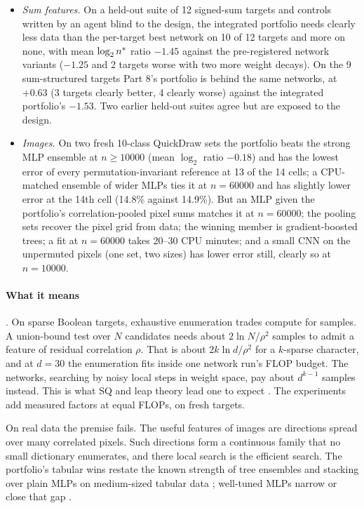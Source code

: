 \begin{itemize}
  \begin{itemize}
  \item \emph{Sum features.} On a held-out suite of 12 signed-sum targets and controls written by an agent blind to the design, the integrated portfolio needs clearly less data than the per-target best network on 10 of 12 targets and more on none, with mean $\log_2n^{*}$ ratio $-1.45$ against the pre-registered network variants ($-1.25$ and 2 targets worse with two more weight decays). On the 9 sum-structured targets Part 8's portfolio is behind the same networks, at $+0.63$ (3 targets clearly better, 4 clearly worse) against the integrated portfolio's $-1.53$. Two earlier held-out suites agree but are exposed to the design.
  \item \emph{Images.} On two fresh 10-class QuickDraw sets the portfolio beats the strong MLP ensemble at $n\ge10000$ (mean $\log_2$ ratio $-0.18$) and has the lowest error of every permutation-invariant reference at 13 of the 14 cells; a CPU-matched ensemble of wider MLPs ties it at $n=60000$ and has slightly lower error at the 14th cell (14.8\% against 14.9\%). But an MLP given the portfolio's correlation-pooled pixel sums matches it at $n=60000$; the pooling sets recover the pixel grid from data; the winning member is gradient-boosted trees; a fit at $n=60000$ takes 20--30 CPU minutes; and a small CNN on the unpermuted pixels (one set, two sizes) has lower error still, clearly so at $n=10000$.
  \end{itemize}
\end{itemize}

\paragraph{What it means} . On sparse Boolean targets, exhaustive enumeration trades compute for samples. A union-bound test over $N$ candidates needs about $2\ln N/\rho^2$ samples to admit a feature of residual correlation $\rho$. That is about $2k\ln d/\rho^2$ for a $k$-sparse character, and at $d=30$ the enumeration fits inside one network run's FLOP budget. The networks, searching by noisy local steps in weight space, pay about $d^{k-1}$ samples instead. This is what SQ and leap theory lead one to expect \cite{kearns1998sq,abbe2022msp,abbe2023leap,barak2022hidden,edelman2023pareto}. The experiments add measured factors at equal FLOPs, on fresh targets.

On real data the premise fails. The useful features of images are directions spread over many correlated pixels. Such directions form a continuous family that no small dictionary enumerates, and there local search is the efficient search. The portfolio's tabular wins restate the known strength of tree ensembles and stacking over plain MLPs on medium-sized tabular data \cite{grinsztajn2022tree,shwartzziv2022tabular,erickson2020autogluon}; well-tuned MLPs narrow or close that gap \cite{kadra2021welltuned,gorishniy2021revisiting}.

